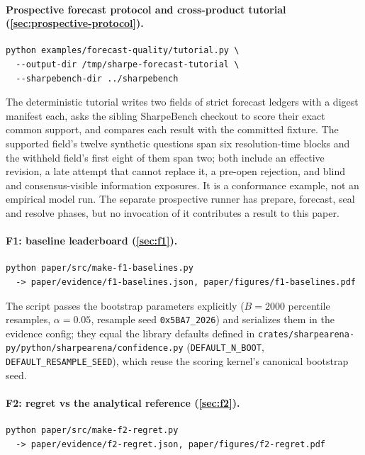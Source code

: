 \paragraph{Prospective forecast protocol and cross-product tutorial (\cref{sec:prospective-protocol}).}
\begin{verbatim}
python examples/forecast-quality/tutorial.py \
  --output-dir /tmp/sharpe-forecast-tutorial \
  --sharpebench-dir ../sharpebench
\end{verbatim}
The deterministic tutorial writes two fields of strict forecast ledgers with a digest manifest each, asks the sibling SharpeBench checkout to score their exact common support, and compares each result with the committed fixture. The supported field's twelve synthetic questions span six resolution-time blocks and the withheld field's first eight of them span two; both include an effective revision, a late attempt that cannot replace it, a pre-open rejection, and blind and consensus-visible information exposures. It is a conformance example, not an empirical model run. The separate prospective runner has prepare, forecast, seal and resolve phases, but no invocation of it contributes a result to this paper.

\paragraph{F1: baseline leaderboard (\cref{sec:f1}).}
\begin{verbatim}
python paper/src/make-f1-baselines.py
  -> paper/evidence/f1-baselines.json, paper/figures/f1-baselines.pdf
\end{verbatim}
The script passes the bootstrap parameters explicitly ($B = 2000$ percentile resamples, $\alpha = 0.05$, resample seed \texttt{0x5BA7\_2026}) and serializes them in the evidence config; they equal the library defaults defined in \texttt{crates/sharpearena-py/python/sharpearena/confidence.py} (\texttt{DEFAULT\_N\_BOOT}, \texttt{DEFAULT\_RESAMPLE\_SEED}), which reuse the scoring kernel's canonical bootstrap seed.

\paragraph{F2: regret vs the analytical reference (\cref{sec:f2}).}
\begin{verbatim}
python paper/src/make-f2-regret.py
  -> paper/evidence/f2-regret.json, paper/figures/f2-regret.pdf
\end{verbatim}

